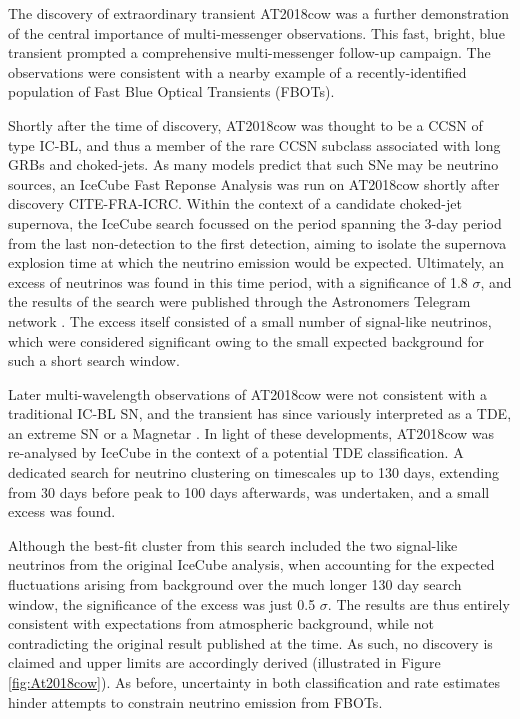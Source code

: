 \documentclass{PoS}
\begin{document}
The discovery of extraordinary transient AT2018cow was a further demonstration of the central importance of multi-messenger observations.  This fast, bright, blue transient prompted a comprehensive multi-messenger follow-up campaign. The observations were consistent with a nearby example of a recently-identified population of Fast Blue Optical Transients (FBOTs). 

Shortly after the time of discovery, AT2018cow was thought to be a CCSN of type IC-BL, and thus a member of the rare CCSN subclass associated with long GRBs and choked-jets. As many models predict that such SNe may be neutrino sources, an IceCube Fast Reponse Analysis was run on AT2018cow shortly after discovery CITE-FRA-ICRC. Within the context of a candidate choked-jet supernova, the IceCube search focussed on the period spanning the 3-day period from the last non-detection to the first detection, aiming to isolate the supernova explosion time at which the neutrino emission would be expected. Ultimately, an excess of neutrinos was found in this time period, with a significance of 1.8 $\sigma$, and the results of the search were published through the Astronomers Telegram network \cite{2018ATel11785....1B}. The excess itself consisted of a small number of signal-like neutrinos, which were considered significant owing to the small expected background for such a short search window.

Later multi-wavelength observations of AT2018cow were not consistent with a traditional IC-BL SN, and the transient has since variously interpreted as a TDE, an extreme SN or a Magnetar \cite{Perley:2018oky}. In light of these developments, AT2018cow was re-analysed by IceCube in the context of a potential TDE classification. A dedicated search for neutrino clustering on timescales up to 130 days, extending from 30 days before peak to 100 days afterwards, was undertaken, and a small excess was found.

Although the best-fit cluster from this search included the two signal-like neutrinos from the original IceCube analysis, when accounting for the expected fluctuations arising from background over the much longer 130 day search window, the significance of the excess was just 0.5 $\sigma$. The results are thus entirely consistent with expectations from atmospheric background, while not contradicting the original result published at the time. As such, no discovery is claimed and upper limits are accordingly derived (illustrated in Figure \ref{fig:At2018cow}). As before, uncertainty in both classification and rate estimates hinder attempts to constrain neutrino emission from FBOTs.
\end{document}
